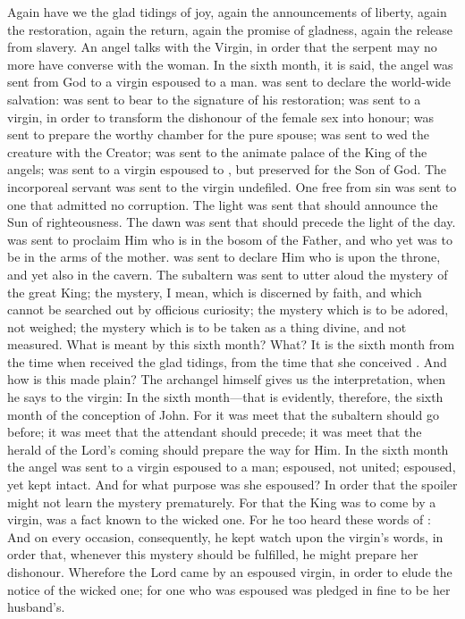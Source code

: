 Again have we the glad tidings of joy, again the announcements of liberty, again the restoration, again the return, again the promise of gladness, again the release from slavery. An angel talks with the Virgin, in order that the serpent may no more have converse with the woman. In the sixth month, it is said, the angel  was sent from God to a virgin espoused to a man.  was sent to declare the world-wide salvation:  was sent to bear to  the signature of his restoration;  was sent to a virgin, in order to transform the dishonour of the female sex into honour;  was sent to prepare the worthy chamber for the pure spouse;  was sent to wed the creature with the Creator;  was sent to the animate palace of the King of the angels;  was sent to a virgin espoused to , but preserved for  the Son of God. The incorporeal servant was sent to the virgin undefiled. One free from sin was sent to one that admitted no corruption. The light was sent that should announce the Sun of righteousness. The dawn was sent that should precede the light of the day.  was sent to proclaim Him who is in the bosom of the Father, and who yet was to be in the arms of the mother.  was sent to declare Him who is upon the throne, and yet also in the cavern. The subaltern was sent to utter aloud the mystery of the great King; the mystery, I mean, which is discerned by faith, and which cannot be searched out by officious curiosity; the mystery which is to be adored, not weighed; the mystery which is to be taken as a thing divine, and not measured.  What is meant by this sixth month? What? It is the sixth month from the time when  received the glad tidings, from the time that she conceived . And how is this made plain? The archangel himself gives us the interpretation, when he says to the virgin:  In the sixth month—that is evidently, therefore, the sixth month of the conception of John. For it was meet that the subaltern should go before; it was meet that the attendant should precede; it was meet that the herald of the Lord's coming should prepare the way for Him. In the sixth month the angel  was sent to a virgin espoused to a man; espoused, not united; espoused, yet kept intact. And for what purpose was she espoused? In order that the spoiler might not learn the mystery prematurely. For that the King was to come by a virgin, was a fact known to the wicked one. For he too heard these words of :  And on every occasion, consequently, he kept watch upon the virgin's words, in order that, whenever this mystery should be fulfilled, he might prepare her dishonour. Wherefore the Lord came by an espoused virgin, in order to elude the notice of the wicked one; for one who was espoused was pledged in fine to be her husband's. 